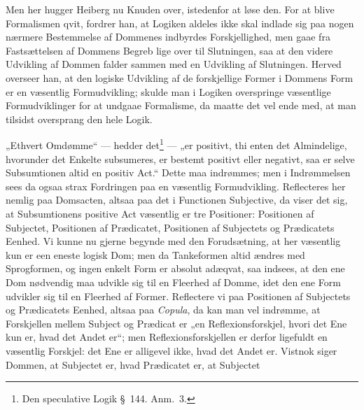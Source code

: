 \documentclass[12pt]{book}
\newcommand{\opage}[1]{\marginnote{\footnotesize\textit{[#1]}}}
\begin{document}
Men her hugger Heiberg nu Knuden over, istedenfor at løse den. For at blive Formalismen qvit, fordrer han, at %
\opage{54}Logiken aldeles ikke skal indlade sig paa nogen nærmere Bestemmelse af Dommenes indbyrdes Forskjellighed, men gaae fra Fastsættelsen af Dommens Begreb lige over til Slutningen, saa at den videre Udvikling af Dommen falder sammen med en Udvikling af Slutningen. Herved overseer han, at den logiske Udvikling af de forskjellige Former i Dommens Form er en væsentlig Formudvikling; skulde man i Logiken overspringe væsentlige Formudviklinger for at undgaae Formalisme, da maatte det vel ende med, at man tilsidst oversprang den hele Logik.

„Ethvert Omdømme“ --- hedder det\footnote{Den speculative Logik §~144. Anm.~3.}%
{} --- „er positivt, thi enten det Almindelige, hvorunder det Enkelte subsumeres, er bestemt positivt eller negativt, saa er selve Subsumtionen altid en positiv Act.“ Dette maa indrømmes; men i Indrømmelsen sees da ogsaa strax Fordringen paa en væsentlig Formudvikling. Reflecteres her nemlig paa Domsacten, altsaa paa det i Functionen Subjective, da viser det sig, at Subsumtionens positive Act væsentlig er tre Positioner: Positionen af Subjectet, Positionen af Prædicatet, Positionen af Subjectets og Prædicatets Eenhed. Vi kunne nu gjerne begynde med den Forudsætning, at her væsentlig kun er een eneste logisk Dom; men da Tankeformen altid ændres med Sprogformen, og ingen enkelt Form er absolut adæqvat, saa indsees, at den ene Dom nødvendig maa udvikle sig til en Fleerhed af Domme, idet den ene Form udvikler sig til en Fleerhed af Former. Reflectere vi paa Positionen af Subjectets og Prædicatets Eenhed, altsaa paa \emph{Copula}, da kan man vel indrømme, at Forskjellen mellem Subject og Prædicat er „en Reflexionsforskjel, hvori det Ene kun er, hvad det Andet er“; men Reflexionsforskjellen er derfor ligefuldt en væsentlig Forskjel: det Ene er alligevel ikke, hvad det Andet er. Vistnok siger Dommen, at Subjectet er, hvad Prædicatet er, at Subjectet %
\end{document}

